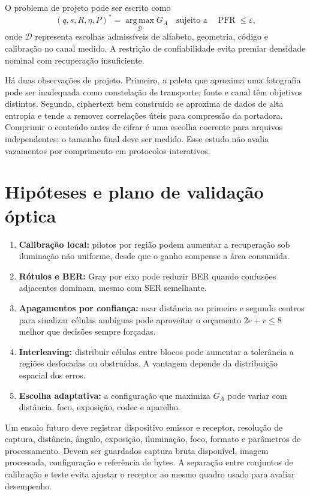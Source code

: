 \documentclass[11pt,a4paper]{article}
\newcommand{\argmax}{\operatorname*{arg\,max}}
\newcommand{\PFR}{\operatorname{PFR}}
\begin{document}
O problema de projeto pode ser escrito como
\begin{equation}
(q,s,R,\eta,P)^*=\argmax_{\mathcal D}G_A
\quad\text{sujeito a}\quad\PFR\le\varepsilon,
\end{equation}
onde $\mathcal D$ representa escolhas admissíveis de alfabeto, geometria, código e calibração no canal medido. A restrição de confiabilidade evita premiar densidade nominal com recuperação insuficiente.

Há duas observações de projeto. Primeiro, a paleta que aproxima uma fotografia pode ser inadequada como constelação de transporte; fonte e canal têm objetivos distintos. Segundo, ciphertext bem construído se aproxima de dados de alta entropia e tende a remover correlações úteis para compressão da portadora. Comprimir o conteúdo antes de cifrar é uma escolha coerente para arquivos independentes; o tamanho final deve ser medido. Esse estudo não avalia vazamentos por comprimento em protocolos interativos.

\section{Hipóteses e plano de validação óptica}
\begin{enumerate}[label=H\arabic*.]
\item \textbf{Calibração local:} pilotos por região podem aumentar a recuperação sob iluminação não uniforme, desde que o ganho compense a área consumida.
\item \textbf{Rótulos e BER:} Gray por eixo pode reduzir BER quando confusões adjacentes dominam, mesmo com SER semelhante.
\item \textbf{Apagamentos por confiança:} usar distância ao primeiro e segundo centros para sinalizar células ambíguas pode aproveitar o orçamento $2e+v\le8$ melhor que decisões sempre forçadas.
\item \textbf{Interleaving:} distribuir células entre blocos pode aumentar a tolerância a regiões desfocadas ou obstruídas. A vantagem depende da distribuição espacial dos erros.
\item \textbf{Escolha adaptativa:} a configuração que maximiza $G_A$ pode variar com distância, foco, exposição, codec e aparelho.
\end{enumerate}
Um ensaio futuro deve registrar dispositivo emissor e receptor, resolução de captura, distância, ângulo, exposição, iluminação, foco, formato e parâmetros de processamento. Devem ser guardados captura bruta disponível, imagem processada, configuração e referência de bytes. A separação entre conjuntos de calibração e teste evita ajustar o receptor ao mesmo quadro usado para avaliar desempenho.
\end{document}
